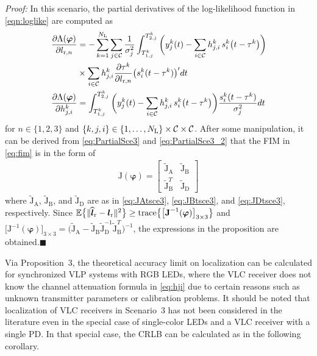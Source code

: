 \documentclass[10pt,twocolumn]{IEEEtran}
\newcommand{\NL}{N_{\rm{L}}}
\newcommand{\bvp}{{\boldsymbol{\varphi}}}
\newcommand{\mtC}{{\mathcal{C}}}
\newcommand{\expectation}{{\mathbb{E}}}
\newcommand{\lr}{{\boldsymbol{l}_{\mathrm{r}}}}
\newcommand{\lrh}{{\widehat{\boldsymbol{l}}_{\mathrm{r}}}}
\newcommand{\lrs}[1]{{l_{\mathrm{r},#1}}}
\newcommand{\Jv}{{\boldsymbol{\mathrm{J}}(\bvp)}}
\newcommand{\Jvi}{{\boldsymbol{\mathrm{J}}^{-1}(\bvp)}}
\newcommand{\JAt}{\tilde{{\boldsymbol{\mathrm{J}}}}_{\boldsymbol{\mathrm{A}}}}
\newcommand{\JBt}{\tilde{{\boldsymbol{\mathrm{J}}}}_{\boldsymbol{\mathrm{B}}}}
\newcommand{\JDt}{\tilde{{\boldsymbol{\mathrm{J}}}}_{\boldsymbol{\mathrm{D}}}}
\begin{document}
\indent\indent\textit{Proof:} In this scenario, the partial derivatives of the log-likelihood function in \eqref{eqn:loglike} are computed as
\begin{align}\nonumber
\frac{\partial\Lambda(\bvp)}{\partial\lrs{n}}&=-\sum_{k=1}^{\NL}\sum_{j\in{\mtC}} \frac{1}{\sigma_j^2} \int_{T^k_{1,j}}^{T^k_{2,j}}
\bigg(y^k_j(t)-\sum_{i\in{\mtC}}h^k_{j,i}\,s^k_i\big(t-\tau^k\big)\bigg)\\\label{eq:PartialSce3}
&\times\sum_{i\in{\mtC}}h^k_{j,i}\frac{{\partial \tau^k}}{{\partial \lrs{n}}} \big(s^k_i(t - \tau^k)\big)' dt \\
\frac{\partial\Lambda(\bvp)}{\partial h^k_{j,i}}&=\int_{T^k_{1,j}}^{T^k_{2,j}}
\bigg(y^k_j(t)-\sum_{i\in{\mtC}}h^k_{j,i}\,s^k_i\big(t-\tau^k\big)\bigg)
\label{eq:PartialSce3_2}
\frac{s^k_i(t - \tau^k)}{\sigma_j^2} dt
\end{align}
for $n\in\{1,2,3\}$ and $\{k,j,i\}\in\{1,\ldots,\NL\}\times\mtC\times\mtC$. After some manipulation, it can be derived from \eqref{eq:PartialSce3} and \eqref{eq:PartialSce3_2} that the FIM in \eqref{eq:fim} is in the form of
\begin{gather}\label{eq:blockMat_3}
	\Jv=\begin{bmatrix}
		\JAt&\JBt\\\JBt^T&\JDt
	\end{bmatrix}
\end{gather}
where $\JAt$, $\JBt$, and $\JDt$ are as in \eqref{eq:JAtsce3}, \eqref{eq:JBtsce3}, and \eqref{eq:JDtsce3}, respectively. Since $\expectation \big\{ \|\lrh - \lr \|^2 \big\}\geq{\rm{trace}}\big\{\big[\Jvi\big]_{3\times3}\big\}$ and $\big[\Jvi\big]_{3\times3}=\big(\JAt-\JBt\JDt^{-1}\JBt^T\big)^{-1}$, the expressions in the proposition are obtained.\hfill$\blacksquare$

Via Proposition~3, the theoretical accuracy limit on localization can be calculated for synchronized VLP systems with RGB LEDs, where the VLC receiver does not know the channel attenuation formula in \eqref{eq:hji} due to certain reasons such as unknown transmitter parameters or calibration problems. It should be noted that localization of VLC receivers in Scenario~3 has not been considered in the literature even in the special case of single-color LEDs and a VLC receiver with a single PD. In that special case, the CRLB can be calculated as in the following corollary.
\end{document}
